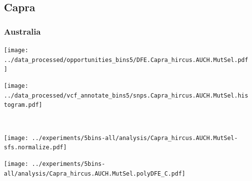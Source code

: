 \subsection{Capra}

\subsubsection{Australia}

\begin{minipage}{0.49\linewidth}
    \texttt{[image: ../data\_processed/opportunities\_bins5/DFE.Capra\_hircus.AUCH.MutSel.pdf]}
\end{minipage}
\begin{minipage}{0.49\linewidth}
    \texttt{[image: ../data\_processed/vcf\_annotate\_bins5/snps.Capra\_hircus.AUCH.MutSel.histogram.pdf]}
\end{minipage}
\\
\begin{minipage}{0.49\linewidth}
    \texttt{[image: ../experiments/5bins-all/analysis/Capra\_hircus.AUCH.MutSel-sfs.normalize.pdf]}
\end{minipage}
\begin{minipage}{0.4\linewidth}
    \texttt{[image: ../experiments/5bins-all/analysis/Capra\_hircus.AUCH.MutSel.polyDFE\_C.pdf]}
\end{minipage}
